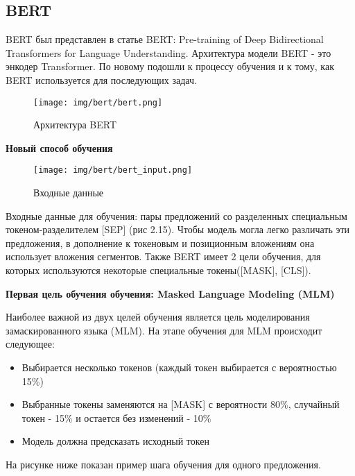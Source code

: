 \documentclass[PMI,VKR]{HSEUniversity}
\begin{document}
\subsection{BERT}

BERT был представлен в статье BERT: Pre-training of Deep Bidirectional Transformers for Language Understanding\cite{bert:2018}. Архитектура модели BERT - это энкодер Transformer. По новому подошли к процессу обучения и к тому, как BERT используется для последующих задач.

\begin{figure}[h]
    \centering
    \texttt{[image: img/bert/bert.png]}
    \caption{Архитектура BERT}
\end{figure}

\begin{center}
    \textbf{Новый способ обучения}
\end{center}

\begin{figure}[h]
    \centering
    \texttt{[image: img/bert/bert\_input.png]}
    \caption{Входные данные}
\end{figure}

Входные данные для обучения: пары предложений со  разделенных специальным токеном-разделителем [SEP] (рис 2.15). Чтобы модель могла легко различать эти предложения, в дополнение к токеновым и позиционным вложениям она использует вложения сегментов. Также BERT имеет 2 цели обучения, для которых используются некоторые специальные токены([MASK], [CLS]). \\

\begin{center}
    \textbf{Первая цель обучения обучения: Masked Language Modeling (MLM)}
\end{center}
Наиболее важной из двух целей обучения является цель моделирования замаскированного языка (MLM). На этапе обучения для MLM происходит следующее:
\begin{itemize}
    \item Выбирается несколько токенов (каждый токен выбирается с вероятностью 15\%)
    \item Выбранные токены заменяются на [MASK] с вероятности 80\%, случайный токен - 15\% и остается без изменений - 10\%
    \item Модель должна предсказать исходный токен
\end{itemize}

На рисунке ниже показан пример шага обучения для одного предложения.
\end{document}

